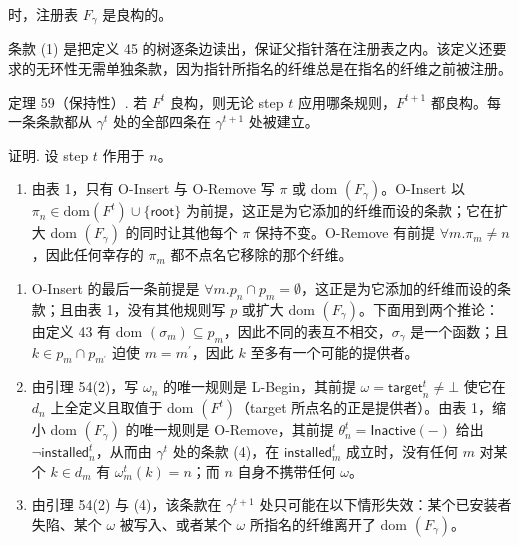 时，注册表 $F _ { \gamma }$ 是良构的。

条款 (1) 是把定义 45 的树逐条边读出，保证父指针落在注册表之内。该定义还要求的无环性无需单独条款，因为指针所指名的纤维总是在指名的纤维之前被注册。

定理 59（保持性）. 若 $F ^ { t }$ 良构，则无论 step $t$ 应用哪条规则，$F ^ { t + 1 }$ 都良构。每一条条款都从 $\gamma ^ { t }$ 处的全部四条在 $\gamma ^ { t + 1 }$ 处被建立。

证明. 设 step $t$ 作用于 $n$。

\begin{enumerate}
\def\labelenumi{(\arabic{enumi})}
\tightlist
\item
  由表 1，只有 O-Insert 与 O-Remove 写 $\pi$ 或 dom $\left( F _ { \gamma } \right)$。O-Insert 以 $\pi _ { n } \in \mathrm { d o m } ( F ^ { t } ) \cup \{ \mathsf{root} \}$ 为前提，这正是为它添加的纤维而设的条款；它在扩大 dom $\left( F _ { \gamma } \right)$ 的同时让其他每个 $\pi$ 保持不变。O-Remove 有前提 $\forall m. \pi _ { m } \neq n$，因此任何幸存的 $\pi _ { m }$ 都不点名它移除的那个纤维。
\end{enumerate}

\begin{enumerate}
\def\labelenumi{(\arabic{enumi})}
\setcounter{enumi}{1}
\item
  O-Insert 的最后一条前提是 $\forall m. p _ { n } \cap p _ { m } = \emptyset$，这正是为它添加的纤维而设的条款；且由表 1，没有其他规则写 $p$ 或扩大 dom $\left( F _ { \gamma } \right)$。下面用到两个推论：由定义 43 有 dom $( \sigma _ { m } ) \subseteq p _ { m }$，因此不同的表互不相交，$\sigma _ { \gamma }$ 是一个函数；且 $k \in p _ { m } \cap p _ { m ^ { \prime } }$ 迫使 $m = m ^ { \prime }$，因此 $k$ 至多有一个可能的提供者。
\item
  由引理 54(2)，写 $\omega _ { n }$ 的唯一规则是 L-Begin，其前提 $\omega = \mathsf { t a r g e t } _ { n } ^ { t } \neq \bot$ 使它在 $d _ { n }$ 上全定义且取值于 dom $\left( F ^ { t } \right)$（target 所点名的正是提供者）。由表 1，缩小 dom $\left( F _ { \gamma } \right)$ 的唯一规则是 O-Remove，其前提 $\theta _ { n } ^ { t } = \mathsf { I n a c t i v e } ( - )$ 给出 $\neg \mathsf { i n s t a l l e d } _ { n } ^ { t }$，从而由 $\gamma ^ { t }$ 处的条款 (4)，在 $\mathsf { i n s t a l l e d } _ { m } ^ { t }$ 成立时，没有任何 $m$ 对某个 $k \in d _ { m }$ 有 $\omega _ { m } ^ { t } ( k ) = n$；而 $n$ 自身不携带任何 $\omega$。
\item
  由引理 54(2) 与 (4)，该条款在 $\gamma ^ { t + 1 }$ 处只可能在以下情形失效：某个已安装者失陷、某个 $\omega$ 被写入、或者某个 $\omega$ 所指名的纤维离开了 dom $\left( F _ { \gamma } \right)$。
\end{enumerate}

